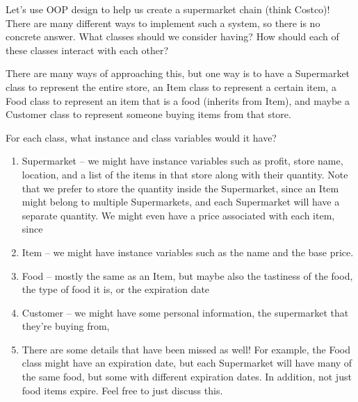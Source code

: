 \begin{blocksection}
Let's use OOP design to help us create a supermarket chain (think Costco)! There are many different ways to implement such a system, so there is no concrete answer.
\question What classes should we consider having? How should each of these classes interact with each other?
\begin{solution}[1.5in] 
There are many ways of approaching this, but one way is to have a Supermarket class to represent the entire store, an Item class to represent a certain item, a Food class to represent an item that is a food (inherits from Item), and maybe a Customer class to represent someone buying items from that store.
\end{solution}

\question For each class, what instance and class variables would it have?
\begin{solution}[1.5in]
\begin{enumerate}[1.]
\item Supermarket -- we might have instance variables such as profit, store name, location, and a list of the items in that store along with their quantity. Note that we prefer to store the quantity inside the Supermarket, since an Item might belong to multiple Supermarkets, and each Supermarket will have a separate quantity. We might even have a price associated with each item, since 
\item Item -- we might have instance variables such as the name and the base price.
\item Food -- mostly the same as an Item, but maybe also the tastiness of the food, the type of food it is, or the expiration date
\item Customer -- we might have some personal information, the supermarket that they're buying from, 
\item There are some details that have been missed as well! For example, the Food class might have an expiration date, but each Supermarket will have many of the same food, but some with different expiration dates. In addition, not just food items expire. Feel free to just discuss this.
\end{enumerate}
\end{solution}


\end{blocksection}
